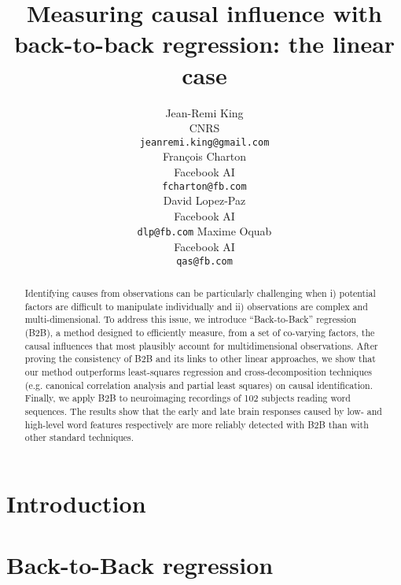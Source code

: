 \documentclass{article}
\title{Measuring causal influence with\\ back-to-back regression: the linear case}
\author{%
  Jean-Remi King\\
  CNRS\\
  \texttt{jeanremi.king@gmail.com} \\
  \And
  Fran\c{c}ois Charton\\
  Facebook AI\\
  \texttt{fcharton@fb.com}\\
  \And
  David Lopez-Paz\\
  Facebook AI\\
  \texttt{dlp@fb.com}
  \And
  Maxime Oquab\\
  Facebook AI\\
  \texttt{qas@fb.com}
}
\begin{document}
\maketitle

\begin{abstract}
Identifying causes from observations can be particularly challenging when i) potential factors are difficult to manipulate individually and ii) observations are complex and multi-dimensional.
To address this issue, we introduce ``Back-to-Back'' regression (B2B), a
method designed to efficiently measure, from a set of co-varying factors, the causal
influences that most plausibly account for multidimensional observations. After
proving the consistency of B2B and its links to other linear approaches, we show that our method outperforms
least-squares regression and cross-decomposition techniques (e.g.
canonical correlation analysis and partial least squares) on causal
identification. Finally, we apply B2B to
neuroimaging recordings of 102 subjects reading word sequences. The results
show that the early and late brain responses caused by low- and high-level
word features respectively are more reliably detected with B2B than with  other standard techniques.
\end{abstract}

\section{Introduction}



\section{Back-to-Back regression}
\label{sec:algorithm}
\end{document}
